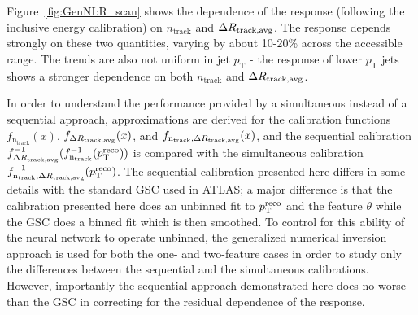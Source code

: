 Figure~\ref{fig:GenNI:R_scan} shows the dependence of the response (following the inclusive energy calibration) on $n_\text{track}$ and $\Delta R_\text{track,avg}$.
The response depends strongly on these two quantities, varying by about 10-20\% across the accessible range.
The trends are also not uniform in jet $p_\text{T}$ - the response of lower $p_\text{T}$ jets shows a stronger dependence on both $n_\text{track}$ and $\Delta R_\text{track,avg}$.



In order to understand the performance provided by a simultaneous instead of a sequential approach, approximations are derived for the calibration functions $f_{\text{n}_\text{track}}(x)$, $f_{\Delta R_\text{track,avg}}(x)$, and $f_{\text{n}_\text{track},\Delta R_\text{track,avg}}(x)$, and the sequential calibration $f^{-1}_{\Delta R_\text{track,avg}}(f^{-1}_{\text{n}_\text{track}}(p_\text{T}^\text{reco}))$ is compared with the simultaneous calibration $f^{-1}_{\text{n}_\text{track},\Delta R_\text{track,avg}}(p_\text{T}^\text{reco})$.
The sequential calibration presented here differs in some details with the standard GSC used in ATLAS; a major difference is that the calibration presented here does an unbinned fit to $p_\text{T}^\text{reco}$ and the feature $\theta$ while the GSC does a binned fit which is then smoothed.
To control for this ability of the neural network to operate unbinned, the generalized numerical inversion approach is used for both the one- and two-feature cases in order to study only the differences between the sequential and the simultaneous calibrations.  
However, importantly the sequential approach demonstrated here does no worse than the GSC in correcting for the residual dependence of the response.

